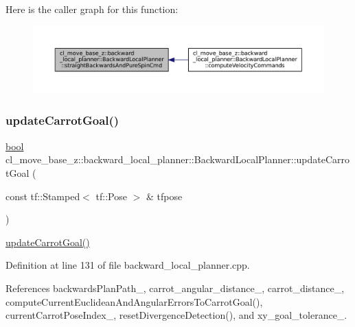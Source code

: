 Here is the caller graph for this function\+:
\nopagebreak
\begin{figure}[H]
\begin{center}
\leavevmode
\includegraphics[width=350pt]{classcl__move__base__z_1_1backward__local__planner_1_1BackwardLocalPlanner_a6069866b4a3150883de3212d8e43e8f8_icgraph}
\end{center}
\end{figure}
\mbox{\label{classcl__move__base__z_1_1backward__local__planner_1_1BackwardLocalPlanner_a16e79a1b4c0f18879f6f0a8ba67103fd}} 
\subsubsection{\texorpdfstring{update\+Carrot\+Goal()}{updateCarrotGoal()}}
{\footnotesize\ttfamily \hyperlink{classbool}{bool} cl\+\_\+move\+\_\+base\+\_\+z\+::backward\+\_\+local\+\_\+planner\+::\+Backward\+Local\+Planner\+::update\+Carrot\+Goal (\begin{DoxyParamCaption}\item[{const tf\+::\+Stamped$<$ tf\+::\+Pose $>$ \&}]{tfpose }\end{DoxyParamCaption})\hspace{0.3cm}{\ttfamily [private]}}

\hyperlink{classcl__move__base__z_1_1backward__local__planner_1_1BackwardLocalPlanner_a16e79a1b4c0f18879f6f0a8ba67103fd}{update\+Carrot\+Goal()} 

Definition at line 131 of file backward\+\_\+local\+\_\+planner.\+cpp.



References backwards\+Plan\+Path\+\_\+, carrot\+\_\+angular\+\_\+distance\+\_\+, carrot\+\_\+distance\+\_\+, compute\+Current\+Euclidean\+And\+Angular\+Errors\+To\+Carrot\+Goal(), current\+Carrot\+Pose\+Index\+\_\+, reset\+Divergence\+Detection(), and xy\+\_\+goal\+\_\+tolerance\+\_\+.



